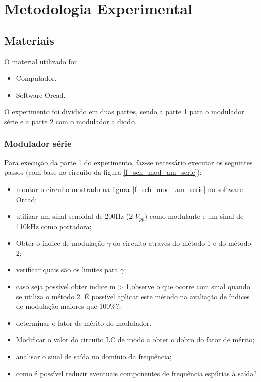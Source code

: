 \newpage
\section{Metodologia Experimental}

\subsection{Materiais}
O material utilizado foi:
\begin{itemize}
    \item Computador.
    \item Software Orcad.
    
\end{itemize}
O experimento foi dividido em duas partes, sendo a parte 1 para o modulador série e a parte 2 com o modulador a diodo.

\subsubsection{Modulador série}
Para execução da parte 1 do experimento, faz-se necessário executar os seguintes passos (com base no circuito da figura \ref{f_sch_mod_am_serie}):

\begin{itemize}
    \item montar o circuito mostrado na figura \ref{f_sch_mod_am_serie} no software Orcad;
    \item utilizar um sinal senoidal de 200Hz (2 $V_{pp}$) como modulante e um sinal de 110kHz como portadora;
    \item Obter o índice de modulação $\gamma$ do circuito através do método 1 e do método 2;
    \item verificar quais são os limites para $\gamma$;
    \item caso seja possível obter índice m > 1,observe o que ocorre com sinal quando se utiliza o método 2. É possível aplicar este método na avaliação de índices de modulação maiores que 100\%?;
    \item determinar o fator de mérito do modulador.
    \item Modificar o valor do circuito LC de modo a obter o dobro do fator de mérito;
    \item analisar o sinal de saída no domínio da frequência;
    \item como é possível reduzir eventuais componentes de frequência espúrias à saída?
\end{itemize}

